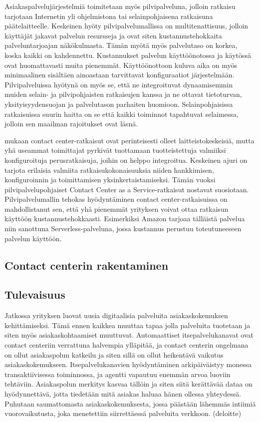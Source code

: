 \documentclass[finnish,12pt,a4paper,pdftex]{article}
\begin{document}
Asiakaspalvelujärjestelmiä toimitetaan myös pilvipalveluna, jolloin ratkaisu tarjotaan Internetin yli ohjelmistona tai selainpohjaisena ratkaisuna päätelaitteelle. Keskeinen hyöty pilvipalvelumallissa on multitenattisuus, jolloin käyttäjät jakavat palvelun resursseja ja ovat siten kustannustehokkaita palveluntarjoajan näkökulmasta. Tämän myötä myös palvelutaso on korkea, koska kaikki on kahdennettu. Kustannukset palvelun käyttöönotossa ja käytössä ovat huomattavasti muita pienemmät. Käyttöönottoon kuluva aika on myös minimaalinen sisältäen ainoastaan tarvittavat konfiguraatiot järjestelmään. Pilvipalveluissa hyötynä on myös se, että ne integroituvat dynaamisemmin muiden selain- ja pilvipohjaisten ratkaisujen kanssa ja ne ottavat tietoturvan, yksityisyydensuojan ja palvelutason parhaiten huomioon. Selainpohjaisissa ratkaisuissa suurin haitta on se että kaikki toiminnot tapahtuvat selaimessa, jolloin sen maailman rajoitukset ovat läsnä. \citep{talkdesk}

\cite{ccgartner} mukaan contact center-ratkaisut ovat perinteisesti olleet laitteistokeskeisiä, mutta yhä useammat toimittajat pyrkivät tuottamaan tuotteistettuja valmiiksi konfiguroituja perusratkaisuja, joihin on helppo integroitua. Keskeinen ajuri on tarjota erilaisia valmiita ratkaisukokonaisuuksia niiden hankkimisen, konfiguroinnin ja toimittamisen yksinkertaistamiseksi. Tämän vuoksi pilvipalvelupohjaiset Contact Center as a Service-ratkaisut nostavat suosiotaan. Pilvipalvelumallin tehokas hyödyntäminen contact center-ratkaisuissa on mahdollistanut sen, että yhä pienemmät yrityksen voivat ottaa ratkaisun käyttöön kustannustehokkaasti. Esimerkiksi Amazon tarjoaa tälläistä palvelua niin sanottuna Serverless-palveluna, jossa kustannus perustuu toteutuneeseen palvelun käyttöön.

\subsection{Contact centerin rakentaminen}

\subsection{Tulevaisuus}

Jatkossa yrityksen luovat uusia digitaalisia palveluita asiakaskokemuksen kehittämiseksi. Tämä ennen kaikkea muuttaa tapaa jolla palveluita tuotetaan ja siten myös asiakaskohtaamiset muuttuvat. Automaattiset itsepalvelukanavat ovat contact centeriin verrattuna halvempia ylläpitää, ja contact centerin ongelmana on ollut asiakaspolun katkeilu ja siten sillä on ollut heikentävä vaikutus asiakaskokemukseen. Itsepalvelukanavien hyödyntäminen arkipäiväistyy monessa transaktiivisessa toiminnossa, ja agentti vapautuu enemmän arvoa luoviin tehtäviin. Asiakaspolun merkitys kasvaa tällöin ja siten siitä kerättävää dataa on hyödynnettävä, jotta tiedetään mitä asiakas haluaa hänen ollessa yhteydessä. Puhutaan saumattomasta asiakaskokemuksesta, jossa päästään lähemmäs intiimiä vuorovaikutusta, joka menetettiin siirrettäessä palveluita verkkoon. (deloitte)
\end{document}

